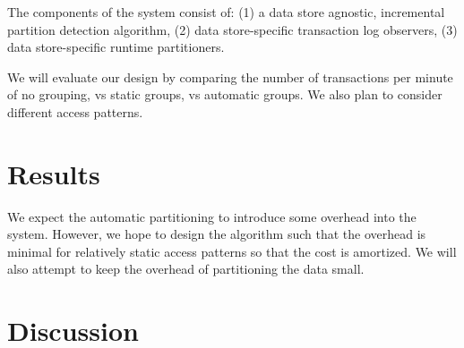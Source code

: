\documentclass[10pt,final,journal]{IEEEtran}
\begin{document}
The components of the system consist of: (1) a data store agnostic, incremental partition detection algorithm, (2) data store-specific transaction log observers, (3) data store-specific runtime partitioners.

We will evaluate our design by comparing the number of transactions per minute of no grouping, vs static groups, vs automatic groups. We also plan to consider different access patterns.

\section{Results}
We expect the automatic partitioning to introduce some overhead into the system. However, we hope to design the algorithm such that the overhead is minimal for relatively static access patterns so that the cost is amortized. We will also attempt to keep the overhead of partitioning the data small.

\section{Discussion}




\end{document}
